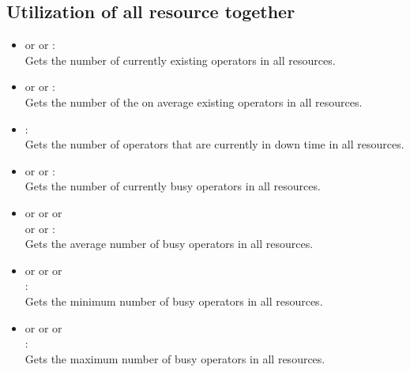 \subsection{Utilization of all resource together}

\begin{itemize}

\item
{} or  or :\\
Gets the number of currently existing operators in all resources.

\item
{} or  or :\\
Gets the number of the on average existing operators in all resources.

\item
{}:\\
Gets the number of operators that are currently in down time in all resources.

\item
{} or  or :\\
Gets the number of currently busy operators in all resources.

\item
{} or  or  or\\
 or  or :\\
Gets the average number of busy operators in all resources.

\item
{} or  or  or\\
:\\
Gets the minimum number of busy operators in all resources.

\item
{} or  or  or\\
:\\
Gets the maximum number of busy operators in all resources.

\end{itemize}  



